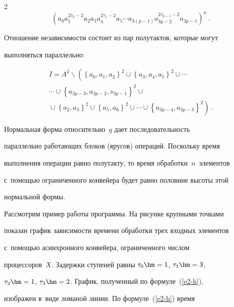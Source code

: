 \begin{multicols}{2}
  $$


  \left( a_0 a_1^{2\tau_0-2} a_2 a_3 a_4^{2\tau_1-2} a_5\cdots a_{3(p-1)} 


  a_{3p-2}^{2\tau_{p-1}-2} a_{3p-1}\right)^n\,.


  $$


Отношение независимости состоит из пар полутактов, которые могут 


выполняться параллельно: 


\begin{multline*}


I=A^2\backslash \left( \left\{ a_0, a_1, a_2\right\}^2 \cup


\left\{ a_3, a_4, a_5\right\}^2 \cup\cdots \right.\\


\cdots \cup \left\{ a_{3p-3},


a_{3p-2}, s_{3p-1}\right\}^2\cup{}\\


\left.{}\cup \left\{ a_2, a_3\right\}^2 \cup


\left\{ a_5, a_6\right\}^2\cup \cdots \cup \left\{ a_{3p-4}, a_{3p-


3}\right\}^2\right)\,.


\end{multline*}


  


  Нормальная форма относительно~$q$ дает последовательность 


параллельно работающих блоков (ярусов) операций. Поскольку время 


выполнения операции равно полутакту, то время обработки~$n$~элементов 


с~по\-мощью ограниченного конвейера будет равно половине высоты этой 


нормальной формы.


  


  Рассмотрим пример работы программы. На рисунке крупными точками 


показан график зависимости времени обработки трех входных элементов 


с~по\-мощью асинхронного конвейера, ограниченного числом 


процессоров~$X$. Задержки ступеней равны $\tau_0\hm=1$, $\tau_1\hm=3$, 


$\tau_2\hm=1$, $\tau_3\hm=2$. График, полученный по формуле~(\ref{e2-h}), 


изображен в~виде ломаной линии. По формуле~(\ref{e2-h}) время 



\end{multicols}

